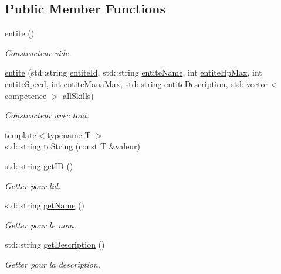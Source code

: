 \subsection*{Public Member Functions}
\begin{DoxyCompactItemize}
\item 
\hyperlink{classentite_a41b83303ba28a228fdfad7de3eed40fe}{entite} ()
\begin{DoxyCompactList}\small\item\em Constructeur vide. \end{DoxyCompactList}\item 
\hyperlink{classentite_a5e655b5c1999ae75dfca0b32de737b1e}{entite} (std\+::string \hyperlink{classentite_a904e8783de9fe2fc4306bf6b7822d025}{entite\+Id}, std\+::string \hyperlink{classentite_abe631a515b1cd0866dcfb078c4ceb07a}{entite\+Name}, int \hyperlink{classentite_a754557f56c1c1fcbcbd40eec68b60f65}{entite\+Hp\+Max}, int \hyperlink{classentite_ad9df70a9bb07f07b3ebf520941c3a35f}{entite\+Speed}, int \hyperlink{classentite_a696167d32c27b3b2a2fa6b473a888b18}{entite\+Mana\+Max}, std\+::string \hyperlink{classentite_a6fab1d9a04ade2cb97ec0904b12c82c9}{entite\+Description}, std\+::vector$<$ \hyperlink{classcompetence}{competence} $>$ all\+Skills)
\begin{DoxyCompactList}\small\item\em Constructeur avec tout. \end{DoxyCompactList}\item 
{\footnotesize template$<$typename T $>$ }\\std\+::string \hyperlink{classentite_ab77d3864b5cfed8364816e27b9eb7077}{to\+String} (const T \&valeur)
\item 
std\+::string \hyperlink{classentite_a3af765474e7f288752f24334d0fc6bbd}{get\+ID} ()
\begin{DoxyCompactList}\small\item\em Getter pour l\textquotesingle{}id. \end{DoxyCompactList}\item 
std\+::string \hyperlink{classentite_a0ebd43d682f234a39faa04bb34173d03}{get\+Name} ()
\begin{DoxyCompactList}\small\item\em Getter pour le nom. \end{DoxyCompactList}\item 
std\+::string \hyperlink{classentite_ab19b8d18b4d947c85063b2225bbb9144}{get\+Description} ()
\begin{DoxyCompactList}\small\item\em Getter pour la description. \end{DoxyCompactList}\item 

\end{DoxyCompactItemize}
